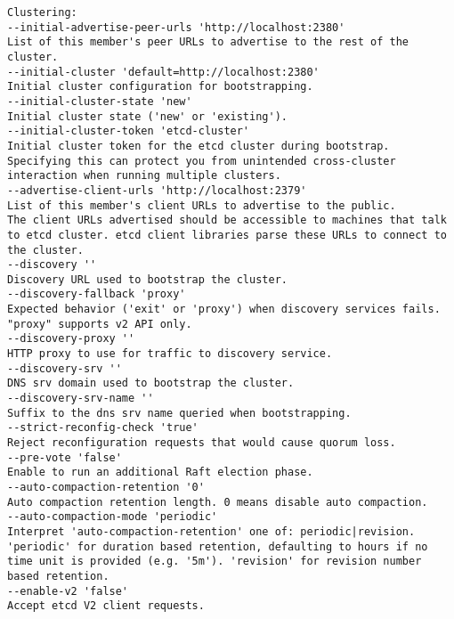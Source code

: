 \begin{verbatim}
Clustering:
--initial-advertise-peer-urls 'http://localhost:2380'
List of this member's peer URLs to advertise to the rest of the cluster.
--initial-cluster 'default=http://localhost:2380'
Initial cluster configuration for bootstrapping.
--initial-cluster-state 'new'
Initial cluster state ('new' or 'existing').
--initial-cluster-token 'etcd-cluster'
Initial cluster token for the etcd cluster during bootstrap.
Specifying this can protect you from unintended cross-cluster interaction when running multiple clusters.
--advertise-client-urls 'http://localhost:2379'
List of this member's client URLs to advertise to the public.
The client URLs advertised should be accessible to machines that talk to etcd cluster. etcd client libraries parse these URLs to connect to the cluster.
--discovery ''
Discovery URL used to bootstrap the cluster.
--discovery-fallback 'proxy'
Expected behavior ('exit' or 'proxy') when discovery services fails.
"proxy" supports v2 API only.
--discovery-proxy ''
HTTP proxy to use for traffic to discovery service.
--discovery-srv ''
DNS srv domain used to bootstrap the cluster.
--discovery-srv-name ''
Suffix to the dns srv name queried when bootstrapping.
--strict-reconfig-check 'true'
Reject reconfiguration requests that would cause quorum loss.
--pre-vote 'false'
Enable to run an additional Raft election phase.
--auto-compaction-retention '0'
Auto compaction retention length. 0 means disable auto compaction.
--auto-compaction-mode 'periodic'
Interpret 'auto-compaction-retention' one of: periodic|revision. 'periodic' for duration based retention, defaulting to hours if no time unit is provided (e.g. '5m'). 'revision' for revision number based retention.
--enable-v2 'false'
Accept etcd V2 client requests.


\end{verbatim}
